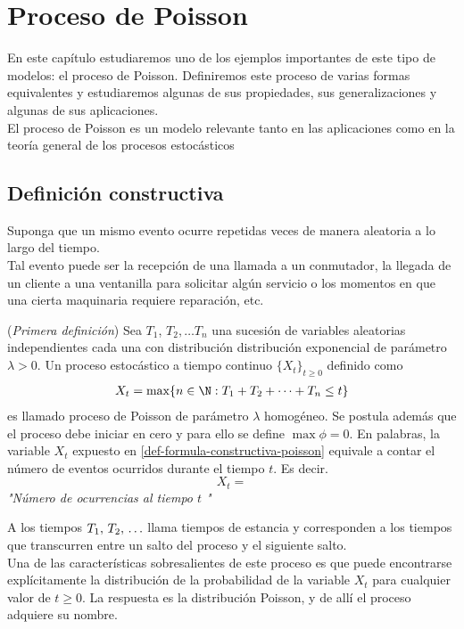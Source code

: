 \section{Proceso de Poisson}
\label{procPoisson-chapter}
En este capítulo estudiaremos uno de los ejemplos
importantes de este tipo de modelos: el proceso de Poisson. Definiremos este proceso de varias formas equivalentes y estudiaremos algunas de sus propiedades, sus generalizaciones y algunas de sus aplicaciones. \\
El proceso de Poisson es un modelo relevante tanto en las aplicaciones como en la teoría general de los procesos estocásticos
\subsection{Definición constructiva}
    Suponga que un mismo evento ocurre repetidas veces de manera aleatoria a lo largo del tiempo.\\
    Tal evento puede ser la recepción de una llamada a un conmutador, la llegada de un cliente a una ventanilla para solicitar algún servicio o los momentos en que una cierta maquinaria requiere reparación, etc.\\
    \begin{Def}(\textit{Primera definición})
        Sea $T_1$, $T_2, \ldots T_n$ una sucesión de variables aleatorias independientes cada una con distribución distribución exponencial de parámetro $\lambda>0$. Un proceso estocástico a tiempo continuo $\{X_t\}_{t\geq 0}$ definido como
        \begin{eqnarray}
            X_t = \max \{ n\in\N : T_1+T_2+\cdots+T_n \leq t\}
            \label{def-formula-constructiva-poisson}
        \end{eqnarray}
        es llamado proceso de Poisson de parámetro $\lambda$ homogéneo.
        Se postula además que el proceso debe iniciar en cero y para ello se define $\max \phi=0$.
        En palabras, la variable $X_t$ expuesto en \ref{def-formula-constructiva-poisson}  equivale a contar el número de eventos ocurridos durante el tiempo $t$. Es decir.
        $$X_t = $$ \textit{ "Número de ocurrencias al tiempo $t$ "}
        \label{def-procesoPoison-constructiva}
    \end{Def}
    A los tiempos $T_1 ,\thinspace T_2,\thinspace\ldots$ llama tiempos de estancia y corresponden a los tiempos que transcurren entre un salto del proceso y el siguiente salto.\\
    Una de las características sobresalientes de este proceso es que puede encontrarse explícitamente la distribución de la probabilidad de la variable $X_t$ para cualquier valor de $t\geq 0$. La respuesta es la distribución Poisson, y de allí el proceso adquiere su nombre.
